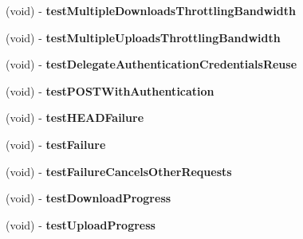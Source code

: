 \begin{DoxyCompactItemize}
\item 
\hypertarget{interface_a_s_i_network_queue_tests_afecabb41732addf7e0b63960536af284}{
(void) -\/ {\bfseries test\-Multiple\-Downloads\-Throttling\-Bandwidth}}
\label{interface_a_s_i_network_queue_tests_afecabb41732addf7e0b63960536af284}

\item 
\hypertarget{interface_a_s_i_network_queue_tests_a3c936cbdc4d5d95c086acccc6b61a277}{
(void) -\/ {\bfseries test\-Multiple\-Uploads\-Throttling\-Bandwidth}}
\label{interface_a_s_i_network_queue_tests_a3c936cbdc4d5d95c086acccc6b61a277}

\item 
\hypertarget{interface_a_s_i_network_queue_tests_ad451f41961e411ca4e0a493564f3782e}{
(void) -\/ {\bfseries test\-Delegate\-Authentication\-Credentials\-Reuse}}
\label{interface_a_s_i_network_queue_tests_ad451f41961e411ca4e0a493564f3782e}

\item 
\hypertarget{interface_a_s_i_network_queue_tests_aa73ecf9606cf1826f4137aef4ff343be}{
(void) -\/ {\bfseries test\-P\-O\-S\-T\-With\-Authentication}}
\label{interface_a_s_i_network_queue_tests_aa73ecf9606cf1826f4137aef4ff343be}

\item 
\hypertarget{interface_a_s_i_network_queue_tests_aa50e545358ffc84eea2a4f61e6d782eb}{
(void) -\/ {\bfseries test\-H\-E\-A\-D\-Failure}}
\label{interface_a_s_i_network_queue_tests_aa50e545358ffc84eea2a4f61e6d782eb}

\item 
\hypertarget{interface_a_s_i_network_queue_tests_a676be0402a758bbd669e8b11f7bb368d}{
(void) -\/ {\bfseries test\-Failure}}
\label{interface_a_s_i_network_queue_tests_a676be0402a758bbd669e8b11f7bb368d}

\item 
\hypertarget{interface_a_s_i_network_queue_tests_a1d3ea45df0ebc0597e234c1a2fa3c35b}{
(void) -\/ {\bfseries test\-Failure\-Cancels\-Other\-Requests}}
\label{interface_a_s_i_network_queue_tests_a1d3ea45df0ebc0597e234c1a2fa3c35b}

\item 
\hypertarget{interface_a_s_i_network_queue_tests_a59b48bbf964a2a4ac6626270d519748a}{
(void) -\/ {\bfseries test\-Download\-Progress}}
\label{interface_a_s_i_network_queue_tests_a59b48bbf964a2a4ac6626270d519748a}

\item 
\hypertarget{interface_a_s_i_network_queue_tests_a75e8fb03b62a4a3c8be34b64407c508a}{
(void) -\/ {\bfseries test\-Upload\-Progress}}
\label{interface_a_s_i_network_queue_tests_a75e8fb03b62a4a3c8be34b64407c508a}


\end{DoxyCompactItemize}
